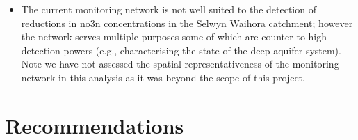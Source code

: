 \begin{itemize}
    \item The current monitoring network is not well suited to the detection of reductions in \gls{no3n} concentrations in the Selwyn Waihora catchment; however the network serves multiple purposes some of which are counter to high detection powers (e.g., characterising the state of the deep aquifer system). Note we have not assessed the spatial representativeness of the monitoring network in this analysis as it was beyond the scope of this project.
\end{itemize}

\section[Recommendations]{Recommendations} \label{sec:recommendations} %


